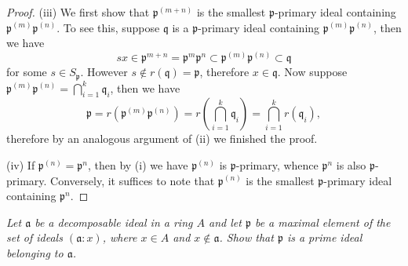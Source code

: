 \begin{proof}
(iii) We first show that $\mathfrak{p}^{(m+n)}$ is the smallest $\mathfrak{p}$-primary ideal containing $\mathfrak{p}^{(m)}\mathfrak{p}^{(n)}$. To see this, suppose $\mathfrak{q}$ is a $\mathfrak{p}$-primary ideal containing $\mathfrak{p}^{(m)}\mathfrak{p}^{(n)}$, then we have 
$$
sx\in \mathfrak{p} ^{m+n}=\mathfrak{p} ^m\mathfrak{p} ^n\subset \mathfrak{p} ^{\left( m \right)}\mathfrak{p} ^{\left( n \right)}\subset \mathfrak{q} 
$$
for some $s\in S_\mathfrak{p}$. However $s\notin r(\mathfrak{q})=\mathfrak{p}$, therefore $x\in\mathfrak{q}$. Now suppose $\mathfrak{p}^{(m)}\mathfrak{p}^{(n)}=\bigcap_{i=1}^k\mathfrak{q}_i$, then we have 
$$
\mathfrak{p} =r\left( \mathfrak{p} ^{\left( m \right)}\mathfrak{p} ^{\left( n \right)} \right) =r\left( \bigcap_{i=1}^k{\mathfrak{q} _i} \right) =\bigcap_{i=1}^k{r\left( \mathfrak{q} _i \right)},
$$
therefore by an analogous argument of (ii) we finished the proof.\par
(iv) If $\mathfrak{p}^{(n)}=\mathfrak{p}^n$, then by (i) we have $\mathfrak{p}^{(n)}$ is $\mathfrak{p}$-primary, whence $\mathfrak{p}^n$ is also $\mathfrak{p}$-primary. Conversely, it suffices to note that $\mathfrak{p}^{(n)}$ is the smallest $\mathfrak{p}$-primary ideal containing $\mathfrak{p}^n$.
\end{proof}
\begin{problem}\em
Let $\mathfrak{a}$ be a decomposable ideal in a ring $A$ and let $\mathfrak{p}$ be a maximal element of the set of ideals $(\mathfrak{a}:x)$, where $x\in A$ and $x\notin\mathfrak{a}$. Show that $\mathfrak{p}$ is a prime ideal belonging to $\mathfrak{a}$.
\end{problem}
